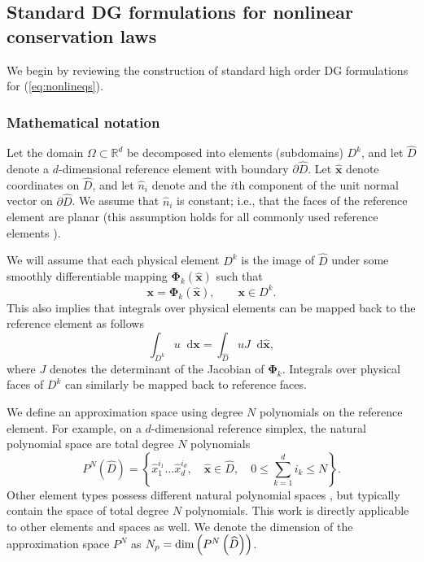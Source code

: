 \documentclass[preprint,10pt]{article}
\theoremstyle{definition}
\theoremstyle{lemma}
\theoremstyle{theorem}
\theoremstyle{assumption}
\renewcommand{\hat}{\widehat}
\newcommand{\LRp}[1]{\left( #1 \right)}
\newcommand{\LRc}[1]{\left\{ #1 \right\}}
\newcommand*\diff[1]{\mathop{}\!{\mathrm{d}#1}} %
\begin{document}
\subsection{Standard DG formulations for nonlinear conservation laws}

We begin by reviewing the construction of standard high order DG formulations for (\ref{eq:nonlineqs}).  

\subsubsection{Mathematical notation}

Let the domain $\Omega \subset \mathbb{R}^d$ be decomposed into elements (subdomains) $D^k$, and let $\hat{D}$ denote a $d$-dimensional reference element with boundary $\partial \hat{D}$.  Let $\hat{\bm{x}}$ denote coordinates on $\hat{D}$, and let $\hat{n}_i$ denote and the $i$th component of the unit normal vector on $\partial \hat{D}$.  We assume that $\hat{n}_i$ is constant; i.e., that the faces of the reference element are planar (this assumption holds for all commonly used reference elements \cite{chan2015gpu}).  

We will assume that each physical element $D^k$ is the image of $\hat{D}$ under some smoothly differentiable mapping $\bm{\Phi}_k(\hat{\bm{x}})$ such that
\[
\bm{x} = \bm{\Phi}_k(\hat{\bm{x}}), \qquad \bm{x}\in D^k.
\]
This also implies that integrals over physical elements can be mapped back to the reference element as follows
\[
\int_{D^k} u \diff{\bm{x}} = \int_{\hat{D}} u J\diff{\hat{\bm{x}}}, 
\]
where $J$ denotes the determinant of the Jacobian of $\bm{\Phi}_k$.  Integrals over physical faces of $D^k$ can similarly be mapped back to reference faces.


We define an approximation space using degree $N$ polynomials on the reference element.  For example, on a $d$-dimensional reference simplex, the natural polynomial space are total degree $N$ polynomials 
\[
P^N\LRp{\widehat{D}} = \LRc{\hat{x}_1^{i_1}\ldots\hat{x}_d^{i_d}, \quad \hat{\bm{x}} \in \widehat{D}, \quad 0\leq \sum_{k=1}^d i_k \leq N}.
\]
Other element types possess different natural polynomial spaces \cite{chan2015gpu}, but typically contain the space of total degree $N$ polynomials.  This work is directly applicable to other elements and spaces as well.  We denote the dimension of the approximation space $P^N$ as $N_p = {\rm dim}\LRp{P^N\LRp{\widehat{D}}}$.
\end{document}
